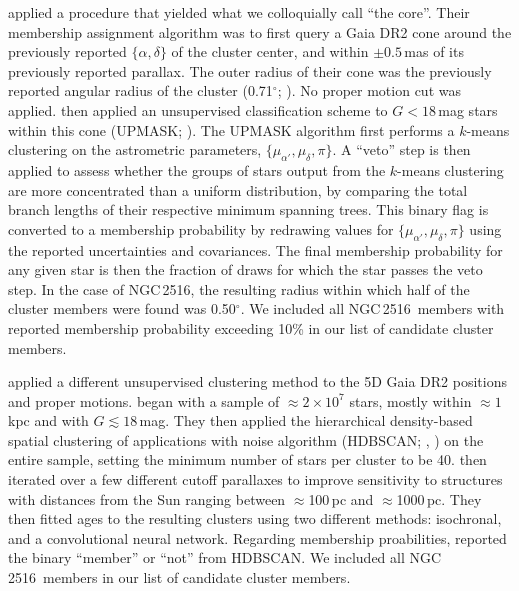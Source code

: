 \documentclass[12pt,twocolumn,tighten]{aastex63}
\newcommand{\cn}{NGC\,2516} %
\begin{document}
 applied a procedure that yielded
what we colloquially call ``the core''.  Their membership assignment
algorithm was to first query a Gaia DR2 cone around the previously
reported $\{\alpha,\delta\}$ of the cluster center, and within $\pm
0.5$\,mas of its previously reported parallax.  The outer radius of
their cone was the previously reported angular radius of the cluster
(0.71$^\circ$; \citealt{Kharchenko_et_al_2013}).  No proper motion cut
was applied.   then applied an
unsupervised classification scheme to $G<18$\,mag stars within this
cone (UPMASK; \citealt{kronemartins_upmask_2014}).  The UPMASK
algorithm first performs a $k$-means clustering on the astrometric
parameters, $\{\mu_{\alpha'}, \mu_\delta, \pi\}$.  A ``veto''
step is then applied to assess whether the groups of stars output from the
$k$-means clustering are more concentrated than a uniform
distribution, by comparing the total branch lengths of their
respective minimum spanning trees.  This binary flag is converted to a
membership probability by redrawing values for $\{\mu_{\alpha'},
\mu_\delta, \pi\}$ using the reported uncertainties and
covariances.  The final membership probability for any given star is
then the fraction of draws for which the star passes the veto step.
In the case of \cn, the resulting radius within which half of the
cluster members were found was 0.50$^\circ$.  We included all
 \cn\ members with reported
membership probability exceeding 10\% in our list of candidate cluster
members.

 applied a different unsupervised
clustering method to the 5D Gaia DR2 positions and proper motions.
 began with a sample of
$\approx$$2\times 10^7$ stars, mostly within $\approx 1$\,kpc and with
$G\lesssim18$\,mag.  They then applied the hierarchical density-based
spatial clustering of applications with noise algorithm (HDBSCAN;
\citealt{campello_hierarchical_2015}, \citealt{mcinnes_hdbscan_2017})
on the entire sample,  setting the minimum number of stars per cluster
to be 40.   then iterated over a
few different cutoff parallaxes to improve sensitivity to structures
with distances from the Sun ranging between $\approx$100\,pc and
$\approx$1000\,pc.  They then fitted ages to the resulting clusters
using two different methods: isochronal, and a convolutional neural
network.  Regarding membership proabilities,
 reported the binary ``member'' or
``not'' from HDBSCAN.
We included all  \cn\ members in
our list of candidate cluster members.
\end{document}
